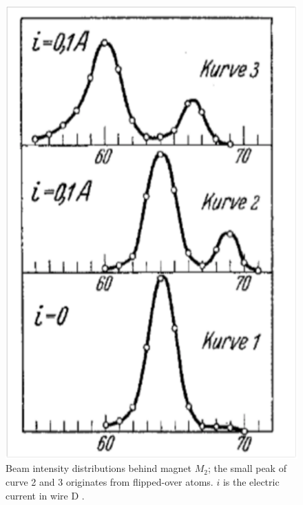 \documentclass[12pt]{article}
\begin{document}
%
\begin{figure}
\begin{center}
\includegraphics[scale=0.4]{figures/FrischSegreResults}
\caption{Beam intensity distributions behind magnet $M_2$; the small peak of curve 2 and 3 originates from flipped-over atoms. $i$ is the electric current in wire D \cite[p.~614]{FrischOEtal1933Einstellung}.}
\label{fig:FrischSegreResults}
\end{center}
\end{figure}
%
\end{document}
